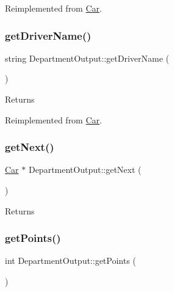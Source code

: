 Reimplemented from \hyperlink{classCar_aadd6f69cf389b293a5e8a098ebc75f1d}{Car}.

\mbox{\label{classDepartmentOutput_a5c2bbaa1979ecbbd06629440884966a0}} 
\subsubsection{\texorpdfstring{get\+Driver\+Name()}{getDriverName()}}
{\footnotesize\ttfamily string Department\+Output\+::get\+Driver\+Name (\begin{DoxyParamCaption}{ }\end{DoxyParamCaption})\hspace{0.3cm}{\ttfamily [virtual]}}

\begin{DoxyReturn}{Returns}

\end{DoxyReturn}


Reimplemented from \hyperlink{classCar_a0192991111c42f7cba809cc9831cd5f3}{Car}.

\mbox{\label{classDepartmentOutput_ab12d572677cc6c3a4b32cc1c5894f54e}} 
\subsubsection{\texorpdfstring{get\+Next()}{getNext()}}
{\footnotesize\ttfamily \hyperlink{classCar}{Car} $\ast$ Department\+Output\+::get\+Next (\begin{DoxyParamCaption}{ }\end{DoxyParamCaption})}

\begin{DoxyReturn}{Returns}

\end{DoxyReturn}
\mbox{\label{classDepartmentOutput_ac1eac849b183dd78906a5b2a7217b8ef}} 
\subsubsection{\texorpdfstring{get\+Points()}{getPoints()}}
{\footnotesize\ttfamily int Department\+Output\+::get\+Points (\begin{DoxyParamCaption}{ }\end{DoxyParamCaption})\hspace{0.3cm}{\ttfamily [virtual]}}

